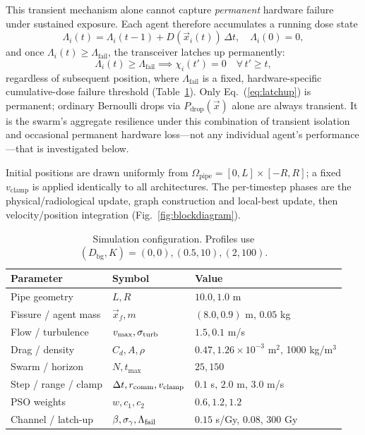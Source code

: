 \documentclass[conference]{IEEEtran}
\begin{document}
This transient mechanism alone cannot capture \emph{permanent} hardware failure under sustained exposure. Each agent therefore accumulates a running dose state
\begin{equation}
\Lambda_i(t) = \Lambda_i(t-1) + D(\vec{x}_i(t))\,\Delta t, \quad \Lambda_i(0)=0,
\label{eq:cumdose}
\end{equation}
and once $\Lambda_i(t)\ge\Lambda_{\text{fail}}$, the transceiver latches up permanently:
\begin{equation}
\Lambda_i(t) \ge \Lambda_{\text{fail}} \implies \chi_i(t') = 0 \quad \forall\,t'\ge t,
\label{eq:latchup}
\end{equation}
regardless of subsequent position, where $\Lambda_{\text{fail}}$ is a fixed, hardware-specific cumulative-dose failure threshold (Table~\ref{tab:sim-params}). Only Eq.~(\ref{eq:latchup}) is permanent; ordinary Bernoulli drops via $P_{\text{drop}}(\vec{x})$ alone are always transient. It is the swarm's aggregate resilience under this combination of transient isolation and occasional permanent hardware loss---not any individual agent's performance---that is investigated below.

Initial positions are drawn uniformly from $\Omega_{\text{pipe}}=[0,L]\times[-R,R]$; a fixed $v_{\text{clamp}}$ is applied identically to all architectures. The per-timestep phases are the physical/radiological update, graph construction and local-best update, then velocity/position integration (Fig.~\ref{fig:blockdiagram}).

\begin{table}[t]
\renewcommand{\arraystretch}{0.82}
\caption{Simulation configuration. Profiles use $(D_{\text{bg}},K)=(0,0),(0.5,10),(2,100)$.}
\label{tab:sim-params}
\centering\scriptsize\setlength{\tabcolsep}{3pt}
\begin{tabular}{@{}lll@{}}
\toprule Parameter & Symbol & Value \\\midrule
Pipe geometry & $L,R$ & $10.0,1.0$ m \\
Fissure / agent mass & $\vec x_f,m$ & $(8.0,0.9)$ m, $0.05$ kg \\
Flow / turbulence & $v_{\max},\sigma_{\rm turb}$ & $1.5,0.1$ m/s \\
Drag / density & $C_d,A,\rho$ & $0.47,1.26\!\times\!10^{-3}$ m$^2$, 1000 kg/m$^3$ \\
Swarm / horizon & $N,t_{\max}$ & $25,150$ \\
Step / range / clamp & $\Delta t,r_{\rm comm},v_{\rm clamp}$ & $0.1$ s, $2.0$ m, $3.0$ m/s \\
PSO weights & $w,c_1,c_2$ & $0.6,1.2,1.2$ \\
Channel / latch-up & $\beta,\sigma_\gamma,\Lambda_{\rm fail}$ & $0.15$ s/Gy, $0.08$, 300 Gy \\
\bottomrule
\end{tabular}
\end{table}
\end{document}
